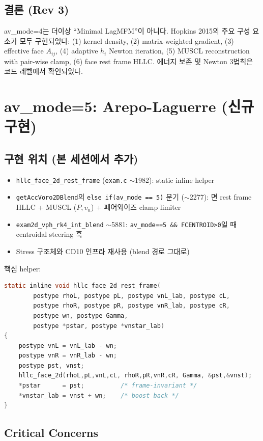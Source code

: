 \documentclass[11pt]{article}
\begin{document}
\subsection{결론 (Rev 3)}
av\_mode=4는 더이상 ``Minimal LagMFM''이 아니다. Hopkins 2015의 주요 구성
요소가 모두 구현되었다: (1) kernel density, (2) matrix-weighted gradient,
(3) effective face $A_{ij}$, (4) adaptive $h_i$ Newton iteration,
(5) MUSCL reconstruction with pair-wise clamp, (6) face rest frame HLLC.
에너지 보존 및 Newton 3법칙은 코드 레벨에서 확인되었다.


\section{av\_mode=5: Arepo-Laguerre (신규 구현)}

\subsection{구현 위치 (본 세션에서 추가)}
\begin{itemize}
  \item \texttt{hllc\_face\_2d\_rest\_frame} (\texttt{exam.c} $\sim$1982): static inline helper
  \item \texttt{getAccVoro2DBlend}의 \texttt{else if(av\_mode == 5)} 분기 ($\sim$2277):
    면 rest frame HLLC + MUSCL ($P, v_n$) + 페어와이즈 clamp limiter
  \item \texttt{exam2d\_vph\_rk4\_int\_blend} $\sim$5881:
    \texttt{av\_mode==5 \&\& FCENTROID>0}일 때 centroidal steering 훅
  \item Stress 구조체와 CD10 인프라 재사용 (blend 경로 그대로)
\end{itemize}

핵심 helper:
\begin{lstlisting}[language=C]
static inline void hllc_face_2d_rest_frame(
        postype rhoL, postype pL, postype vnL_lab, postype cL,
        postype rhoR, postype pR, postype vnR_lab, postype cR,
        postype wn, postype Gamma,
        postype *pstar, postype *vnstar_lab)
{
    postype vnL = vnL_lab - wn;
    postype vnR = vnR_lab - wn;
    postype pst, vnst;
    hllc_face_2d(rhoL,pL,vnL,cL, rhoR,pR,vnR,cR, Gamma, &pst,&vnst);
    *pstar      = pst;          /* frame-invariant */
    *vnstar_lab = vnst + wn;    /* boost back */
}
\end{lstlisting}

\subsection{Critical Concerns}
\end{document}
